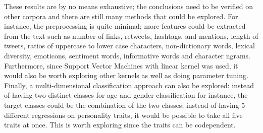 \documentclass[a4paper]{llncs}
\begin{document}
These results are by no means exhaustive; the conclusions need to be verified on other corpora and there are still many methods that could be explored. For instance, the preprocessing is quite minimal; more features could be extracted from the text such as number of links, retweets, hashtags, and mentions, length of tweets, ratios of uppercase to lower case characters, non-dictionary words, lexical diversity, emoticons, sentiment words, informative words and character ngrams. Furthermore, since Support Vector Machines with linear kernel was used, it would also be worth exploring other kernels as well as doing parameter tuning. Finally, a multi-dimensional classification approach can also be explored: instead of having two distinct classes for age and gender classification for instance, the target classes could be the combination of the two classes; instead of having 5 different regressions on personality traits, it would be possible to take all five traits at once. This is worth exploring since the traits can be codependent.






\end{document}
